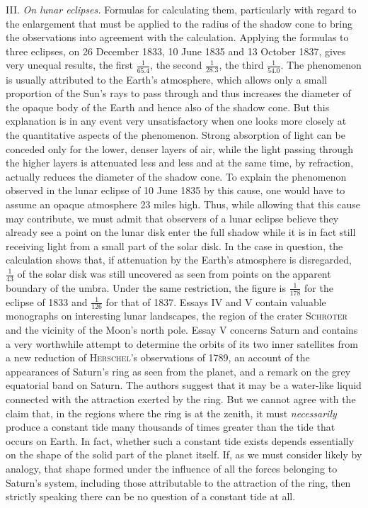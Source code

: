 III. \emph{On lunar eclipses.} Formulas for calculating them, particularly with regard to the enlargement that must be applied to the radius of the shadow cone to bring the observations into agreement with the calculation. Applying the formulas to three eclipses, on 26 December 1833, 10 June 1835 and 13 October 1837, gives very unequal results, the first $\frac{1}{65.4}$, the second $\frac{1}{28.3}$, the third $\frac{1}{54.0}$. The phenomenon is usually attributed to the Earth's atmosphere, which allows only a small proportion of the Sun's rays to pass through and thus increases the diameter of the opaque body of the Earth and hence also of the shadow cone. But this explanation is in any event very unsatisfactory when one looks more closely at the quantitative aspects of the phenomenon. Strong absorption of light can be conceded only for the lower, denser layers of air, while the light passing through the higher layers is attenuated less and less and at the same time, by refraction, actually reduces the diameter of the shadow cone. To explain the phenomenon observed in the lunar eclipse of 10 June 1835 by this cause, one would have to assume an opaque atmosphere 23 miles high. Thus, while allowing that this cause may contribute, we must admit that observers of a lunar eclipse believe they already see a point on the lunar disk enter the full shadow while it is in fact still receiving light from a small part of the solar disk. In the case in question, the calculation shows that, if attenuation by the Earth's atmosphere is disregarded, $\frac{1}{43}$ of the solar disk was still uncovered as seen from points on the apparent boundary of the umbra. Under the same restriction, the figure is $\frac{1}{178}$ for the eclipse of 1833 and $\frac{1}{126}$ for that of 1837.
Essays IV and V contain valuable monographs on interesting lunar landscapes, the region of the crater \textsc{Schröter} and the vicinity of the Moon's north pole. Essay V concerns Saturn and contains a very worthwhile attempt to determine the orbits of its two inner satellites from a new reduction of \textsc{Herschel}'s observations of 1789, an account of the appearances of Saturn's ring as seen from the planet, and a remark on the grey equatorial band on Saturn. The authors suggest that it may be a water-like liquid connected with the attraction exerted by the ring. But we cannot agree with the claim that, in the regions where the ring is at the zenith, it must \emph{necessarily} produce a constant tide many thousands of times greater than the tide that occurs on Earth. In fact, whether such a constant tide exists depends essentially on the shape of the solid part of the planet itself. If, as we must consider likely by analogy, that shape formed under the influence of all the forces belonging to Saturn's system, including those attributable to the attraction of the ring, then strictly speaking there can be no question of a constant tide at all.
